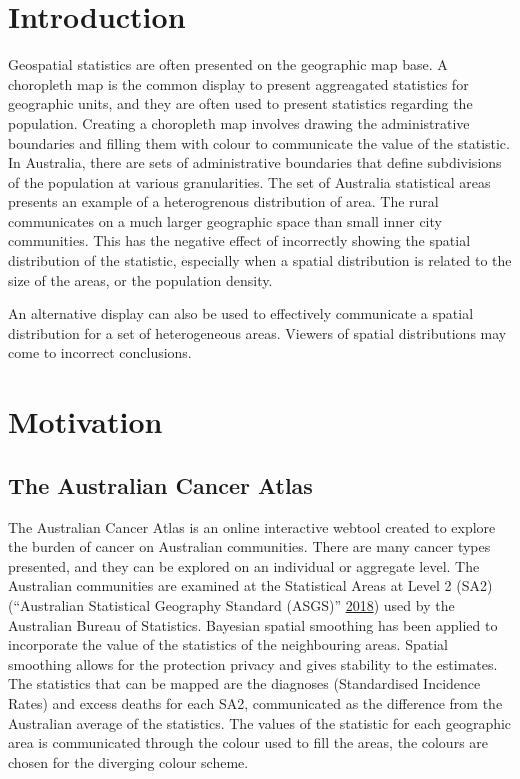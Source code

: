 \documentclass[conference,final,]{IEEEtran}
\begin{document}
\hypertarget{introduction}{%
\section{Introduction}\label{introduction}}

Geospatial statistics are often presented on the geographic map base. A
choropleth map is the common display to present aggreagated statistics
for geographic units, and they are often used to present statistics
regarding the population. Creating a choropleth map involves drawing the
administrative boundaries and filling them with colour to communicate
the value of the statistic. In Australia, there are sets of
administrative boundaries that define subdivisions of the population at
various granularities. The set of Australia statistical areas presents
an example of a heterogrenous distribution of area. The rural
communicates on a much larger geographic space than small inner city
communities. This has the negative effect of incorrectly showing the
spatial distribution of the statistic, especially when a spatial
distribution is related to the size of the areas, or the population
density.

An alternative display can also be used to effectively communicate a
spatial distribution for a set of heterogeneous areas. Viewers of
spatial distributions may come to incorrect conclusions.

\hypertarget{motivation}{%
\section{Motivation}\label{motivation}}

\hypertarget{the-australian-cancer-atlas}{%
\subsection{The Australian Cancer
Atlas}\label{the-australian-cancer-atlas}}

The Australian Cancer Atlas is an online interactive webtool created to
explore the burden of cancer on Australian communities. There are many
cancer types presented, and they can be explored on an individual or
aggregate level. The Australian communities are examined at the
Statistical Areas at Level 2 (SA2) (``Australian Statistical Geography
Standard (ASGS)'' \protect\hyperlink{ref-abs2016}{2018}) used by the
Australian Bureau of Statistics. Bayesian spatial smoothing has been
applied to incorporate the value of the statistics of the neighbouring
areas. Spatial smoothing allows for the protection privacy and gives
stability to the estimates. The statistics that can be mapped are the
diagnoses (Standardised Incidence Rates) and excess deaths for each SA2,
communicated as the difference from the Australian average of the
statistics. The values of the statistic for each geographic area is
communicated through the colour used to fill the areas, the colours are
chosen for the diverging colour scheme.
\end{document}
